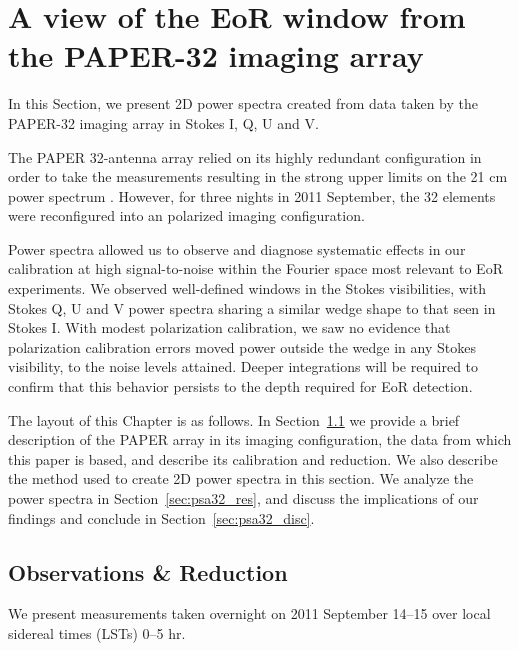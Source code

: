 \chapter{A view of the EoR window from the PAPER-32 imaging array}
\label{chapter:eor_window_paper32img}

In this Section, we present 2D power spectra created from data taken by the PAPER-32 imaging array in Stokes I, Q, U and V. 

The PAPER 32-antenna array relied on its highly redundant configuration in order to take the measurements resulting in the strong upper limits on the 21 cm power spectrum \citep{Parsons.14, Jacobs.15, Moore.17}. However, for three nights in 2011 September, the 32 elements were reconfigured into an polarized imaging configuration. 

Power spectra allowed us to observe and diagnose systematic effects in our calibration at high signal-to-noise within the Fourier space most relevant to EoR experiments. We observed well-defined windows in the Stokes visibilities, with Stokes Q, U and V power spectra sharing a similar wedge shape to that seen in Stokes I.  With modest polarization calibration, we saw no evidence that polarization calibration errors moved power outside the wedge in any Stokes visibility, to the noise levels attained.  Deeper integrations will be required to confirm that this behavior persists to the depth required for EoR detection.

The layout of this Chapter is as follows.  In Section~\ref{sec:psa32_obs} we provide a brief description of the PAPER array in its imaging configuration, the data from which this paper is based, and describe its calibration and reduction. We also describe the method used to create 2D power spectra in this section. We analyze the power spectra in Section~\ref{sec:psa32_res}, and discuss the implications of our findings and conclude in Section~\ref{sec:psa32_disc}.

\section{Observations \& Reduction}
\label{sec:psa32_obs}
We present measurements taken overnight on 2011 September 14--15 over local sidereal times (LSTs) 0--5 hr.

